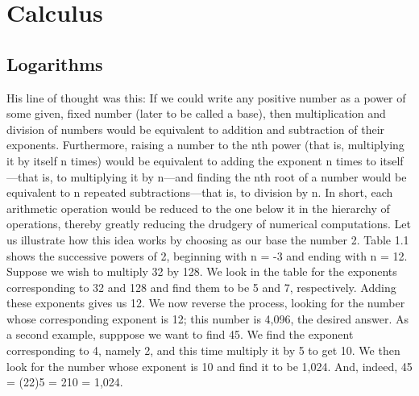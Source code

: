 \chapter{Calculus}

\section{Logarithms}
His line of thought was this: If we could write any positive number as a power of some given, fixed number (later to be called a base), then multiplication and division of numbers would be equivalent to addition and subtraction of their exponents. Furthermore, raising a number to the nth power (that is, multiplying it by itself n times) would be equivalent to adding the exponent n times to itself—that is, to multiplying it by n—and finding the nth root of a number would be equivalent to n repeated subtractions—that is, to division by n. In short, each arithmetic operation would be reduced to the one below it in the hierarchy of operations, thereby greatly reducing the drudgery of numerical computations. Let us illustrate how this idea works by choosing as our base the number 2. Table 1.1 shows the successive powers of 2, beginning with n = -3 and ending with n = 12. Suppose we wish to multiply 32 by 128. We look in the table for the exponents corresponding to 32 and 128 and find them to be 5 and 7, respectively. Adding these exponents gives us 12. We now reverse the process, looking for the number whose corresponding exponent is 12; this number is 4,096, the desired answer. As a second example, supppose we want to find 45. We find the exponent corresponding to 4, namely 2, and this time multiply it by 5 to get 10. We then look for the number whose exponent is 10 and find it to be 1,024. And, indeed, 45 = (22)5 = 210 = 1,024.


